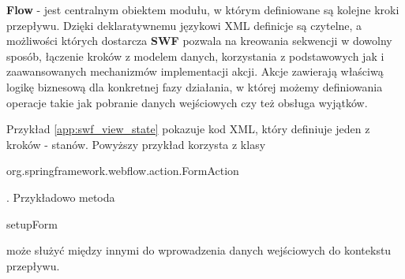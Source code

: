 	\textbf{Flow}\cite{spring_swf_reference} - jest centralnym obiektem modułu, w którym definiowane są kolejne kroki przepływu. Dzięki
	deklaratywnemu językowi XML definicje są czytelne, a możliwości których dostarcza \textbf{SWF} pozwala na kreowania sekwencji
	w dowolny sposób, łączenie kroków z modelem danych, korzystania z podstawowych jak i zaawansowanych mechanizmów implementacji
	akcji. Akcje zawierają właściwą logikę biznesową dla konkretnej fazy działania, w której możemy definiowania operacje takie
	jak pobranie danych wejściowych czy też obsługa wyjątków. 
	
	Przykład \ref{app:swf_view_state} pokazuje kod XML, który definiuje jeden z kroków - stanów. Powyższy przykład korzysta z klasy
	\begin{code}org.springframework.webflow.action.FormAction\end{code}. Przykładowo metoda \begin{code}setupForm\end{code} może
	służyć między innymi do wprowadzenia danych wejściowych do kontekstu przepływu.

